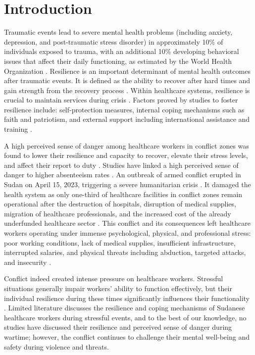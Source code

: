 \documentclass[12pt]{article}
\begin{document}
\section*{Introduction }

Traumatic events lead to severe mental health problems (including anxiety, depression, and post-traumatic stress disorder) in approximately 10\% of individuals exposed to trauma, with an additional 10\% developing behavioral issues that affect their daily functioning, as estimated by the World Health Organization \cite{murthy2006mental, scholte2004mental}. 
Resilience is an important determinant of mental health outcomes after traumatic events. It is defined as the ability to recover after hard times and gain strength from the recovery process \cite{yates2015resilience}. Within healthcare systems, resilience is crucial to maintain services during crisis \cite{witter2017experience}. Factors proved by studies to foster resilience include: self-protection measures, internal coping mechanisms such as faith and patriotism, and external support including international assistance and training \cite{witter2017experience}.

A high perceived sense of danger among healthcare workers in conflict zones was found to lower their resilience and capacity to recover, elevate their stress levels, and affect their report to duty \cite{khader2015factors, wurie2016retention}. Studies have linked a high perceived sense of danger to higher absenteeism rates \cite{khader2015factors, wurie2016retention}. 
An outbreak of armed conflict erupted in Sudan on April 15, 2023, triggering a severe humanitarian crisis \cite{sberro2023resilience}. It damaged the health system as only one-third of healthcare facilities in conflict zones remain operational after the destruction of hospitals, disruption of medical supplies, migration of healthcare professionals, and the increased cost of the already underfunded healthcare sector \cite{alnassar2023mental, abugraga2023health}. 
This conflict and its consequences left healthcare workers operating under immense psychological, physical, and professional stress: poor working conditions, lack of medical supplies, insufficient infrastructure, interrupted salaries, and physical threats including abduction, targeted attacks, and insecurity \cite{bashir2022religiosity}. 

Conflict indeed created intense pressure on healthcare workers. Stressful situations generally impair workers’ ability to function effectively, but their individual resilience during these times significantly influences their functionality \cite{zaman2023parental, saleh2024barriers}. Limited literature discusses the resilience and coping mechanisms of Sudanese healthcare workers during stressful events, and to the best of our knowledge, no studies have discussed their resilience and perceived sense of danger during wartime; however, the conflict continues to challenge their mental well-being and safety during violence and threats.
\end{document}
